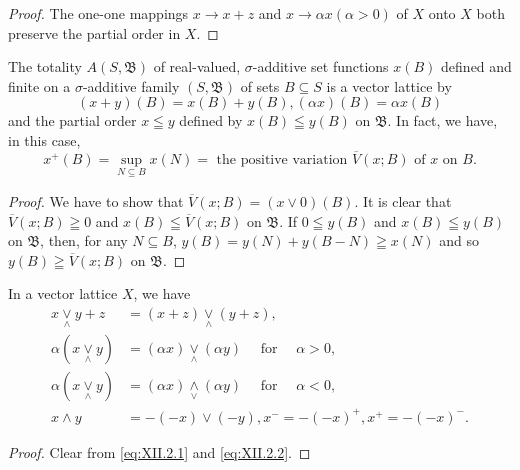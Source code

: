 \begin{proof}
 The one-one mappings $x \rightarrow x + z$ and $x \rightarrow \alpha x (\alpha > 0)$ of $X$ onto $X$ both preserve the partial order in $X$. 
\end{proof}

\begin{examplen} The totality $A(S, \mathfrak{B})$ of real-valued, $\sigma$-additive set functions $x(B)$ defined and finite on a $\sigma$-additive family $(S, \mathfrak{B})$ of sets $B \subseteq S$ is a vector lattice by
\[
(x + y) (B) = x (B) + y (B), (\alpha x) (B) = \alpha x (B)
\]
and the partial order $x \leqq y$ defined by $x(B) \leqq y(B)$ on $\mathfrak{B}$. In fact, we have, in this case, 
\begin{equation}\label{eq:XII.2.5}
x ^{+} (B) = \sup\limits _{N \subseteq B} x (N) = \text{ the positive variation } \overline {{V}} (x; B) \text{ of } x \text{ on } B.
\end{equation}

\end{examplen}
\begin{proof}
 We have to show that $\overline{V}(x; B) = (x \vee 0)(B)$. It is clear that $\overline{V}(x; B) \geqq 0$ and $x(B) \leqq \overline{V}(x; B)$ on $\mathfrak{B}$. If $0 \leqq y(B)$ and $x(B) \leqq y(B)$ on $\mathfrak{B}$, then, for any $N \subseteq B$, $y(B) = y(N) + y(B - N) \geqq x(N)$ and so $y(B) \geqq \overline{V}(x; B)$ on $\mathfrak{B}$. 
\end{proof}

\begin{proposition}\label{prop:XII.2.Proposition.2} In a vector lattice $X$, we have 
\begin{align}
x \underset {\wedge} {\vee} y + z& = (x + z) \underset {\wedge} {\vee} (y + z), \label{eq:XII.2.6} \\
\alpha (x \underset {\wedge} {\vee} y)& = (\alpha x) \underset {\wedge} {\vee} (\alpha y) \quad \text{ for } \quad \alpha > 0, \label{eq:XII.2.7} \\
\alpha (x \underset {\wedge} {\vee} y)& = (\alpha x) \underset {\vee} {\wedge} (\alpha y) \quad \text{ for } \quad \alpha < 0, \label{eq:XII.2.8} \\
x \wedge y& = - (- x) \vee (- y), x ^{-} = - (- x) ^{+}, x ^{+} = - (- x) ^{-}. \label{eq:XII.2.9}
\end{align}
\end{proposition}

\begin{proof}
 Clear from \eqref{eq:XII.2.1} and \eqref{eq:XII.2.2}. 
\end{proof}

